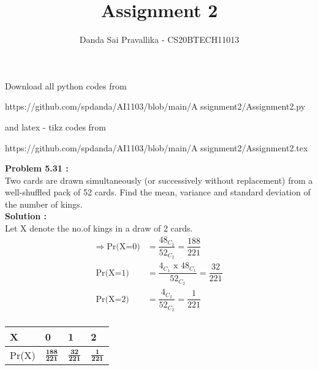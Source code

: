 \documentclass[journal,12pt,twocolumn]{IEEEtran}
\title{Assignment 2}
\author{Danda Sai Pravallika  - CS20BTECH11013}
\begin{document}
\maketitle
Download all python codes from
\begin{tcolorbox}
https://github.com/spdanda/AI1103/blob/main/A
ssignment2/Assignment2.py
\end{tcolorbox}
and latex - tikz codes from 
\begin{tcolorbox}
https://github.com/spdanda/AI1103/blob/main/A
ssignment2/Assignment2.tex
\end{tcolorbox}
\large\textbf{Problem 5.31 :}\\
Two cards are drawn simultaneously (or successively without replacement) from a well-shuffled  pack  of  52  cards.  Find  the  mean, variance and standard deviation of the number of kings.\\
\textbf{Solution :}\\
Let X denote the no.of kings in a draw of 2 cards.
\begin{align}
\Longrightarrow\; \text{Pr(X=0)} &= \dfrac{48_{C_2}}{52_{C_2}}=\dfrac{188}{221} \\
\text{Pr(X=1)} &= \dfrac{4_{C_1}\text{ x }48_{C_1}}{52_{C_2}}=\dfrac{32}{221} \\ 
\text{Pr(X=2)}&=\dfrac{4_{C_2}}{52_{C_2}}= \dfrac{1}{221}\\ \nonumber
\end{align}
\vspace*{-2cm}
\begin{center}
\begin{tabular}{ | m{1.2cm} | m{1.5cm}| m{1.5cm} | m{1.5cm} | } 
\hline \vspace{2pt}

\large X     & \hspace{0.5cm}0                & \hspace{0.5cm}1               & \hspace{0.5cm}2             \\ \hline \vspace{6pt}
\large Pr(X) & \hspace{0.5cm}\(\frac{\textbf{188}}{\textbf{221}}\) & \hspace{0.5cm}\(\frac{\textbf{32}}{\textbf{221}}\) & \;\;\;\(\frac{\textbf{1}}{\textbf{221}}\)\\ 
\hline
\end{tabular}
\end{center}
\vspace{0.3cm}
\end{document}

